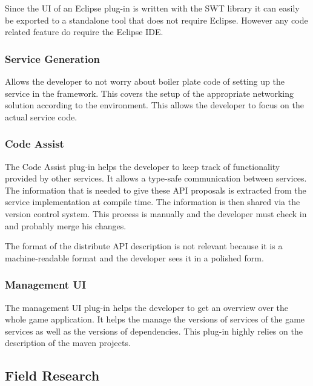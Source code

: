 Since the UI of an Eclipse plug-in is written with the SWT library it can easily
be exported to a standalone tool that does not require Eclipse. However any code
related feature do require the Eclipse IDE.

\subsubsection{Service Generation}

Allows the developer to not worry about boiler plate code of setting up the
service in the framework. This covers the setup of the appropriate networking
solution according to the environment. This allows the developer to focus on the
actual service code.

\subsubsection{Code Assist}

The Code Assist plug-in helps the developer to keep track of functionality
provided by other services. It allows a type-safe communication between
services. The information that is needed to give these API proposals is
extracted from the service implementation at compile time. The information is
then shared via the version control system. This process is manually and the
developer must check in and probably merge his changes. 

The format of the distribute API description is not relevant because it is a
machine-readable format and the developer sees it in a polished form.

\subsubsection{Management UI}

The management UI plug-in helps the developer to get an overview over the whole
game application. It helps the manage the versions of services of the game
services as well as the versions of dependencies. This plug-in highly relies on
the description of the maven projects.

\subsection{Field Research}
